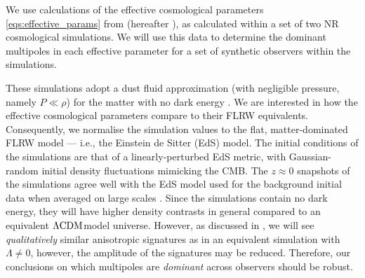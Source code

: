 \documentclass[fleqn,usenatbib]{mnras}
\newcommand{\lcdm}{$\Lambda\rm{CDM}$} %
\begin{document}
{We use calculations of the effective cosmological parameters \eqref{eqs:effective_params} from \citet{Macpherson_Heinesen_2021} (hereafter ), as calculated within a set of two NR cosmological simulations. We will use this data to determine the dominant multipoles in each effective parameter for a set of synthetic observers within the simulations. 
}

These %
simulations adopt a dust fluid approximation {(with negligible pressure, namely $P\ll \rho$)} for the matter with no dark energy \citep[see][for further details on the software and physical assumptions of the simulations]{MacphersonNR2019}.
{We are interested in how the effective cosmological parameters compare to their FLRW equivalents. }
Consequently, %
we normalise the simulation values to {the} flat, matter-dominated FLRW model {--- i.e., the} Einstein de Sitter (EdS) model. The initial conditions {of the simulations} are that of a linearly-perturbed EdS metric, with Gaussian-random initial density fluctuations mimicking the CMB. {The $z\approx 0$ snapshots of the simulations agree well with the EdS model used for the background initial data when averaged on large scales \citep[see][]{MacphersonNR2019}.}
Since the simulations contain no dark energy, they will have higher density contrasts in general compared to an equivalent \lcdm model universe. However, as discussed in , we will see \textit{qualitatively} similar anisotropic signatures as in an equivalent simulation with $\Lambda\neq 0$, however, the amplitude of the signatures may be reduced. {Therefore, our conclusions on which multipoles are \textit{dominant} across observers should be robust. }
\end{document}
